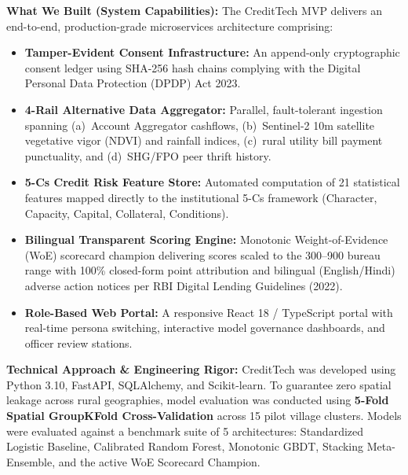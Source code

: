 \vspace{0.3cm}
\noindent\textbf{What We Built (System Capabilities):} The CreditTech MVP delivers an end-to-end, production-grade microservices architecture comprising:
\begin{itemize}[leftmargin=1.5em, itemsep=2pt]
  \item \textbf{Tamper-Evident Consent Infrastructure:} An append-only cryptographic consent ledger using SHA-256 hash chains complying with the Digital Personal Data Protection (DPDP) Act 2023.
  \item \textbf{4-Rail Alternative Data Aggregator:} Parallel, fault-tolerant ingestion spanning (a)~Account Aggregator cashflows, (b)~Sentinel-2 10m satellite vegetative vigor (NDVI) and rainfall indices, (c)~rural utility bill payment punctuality, and (d)~SHG/FPO peer thrift history.
  \item \textbf{5-Cs Credit Risk Feature Store:} Automated computation of 21 statistical features mapped directly to the institutional 5-Cs framework (Character, Capacity, Capital, Collateral, Conditions).
  \item \textbf{Bilingual Transparent Scoring Engine:} Monotonic Weight-of-Evidence (WoE) scorecard champion delivering scores scaled to the 300--900 bureau range with 100\% closed-form point attribution and bilingual (English/Hindi) adverse action notices per RBI Digital Lending Guidelines (2022).
  \item \textbf{Role-Based Web Portal:} A responsive React 18 / TypeScript portal with real-time persona switching, interactive model governance dashboards, and officer review stations.
\end{itemize}

\vspace{0.3cm}
\noindent\textbf{Technical Approach \& Engineering Rigor:} CreditTech was developed using Python 3.10, FastAPI, SQLAlchemy, and Scikit-learn. To guarantee zero spatial leakage across rural geographies, model evaluation was conducted using \textbf{5-Fold Spatial GroupKFold Cross-Validation} across 15 pilot village clusters. Models were evaluated against a benchmark suite of 5 architectures: Standardized Logistic Baseline, Calibrated Random Forest, Monotonic GBDT, Stacking Meta-Ensemble, and the active WoE Scorecard Champion. 

